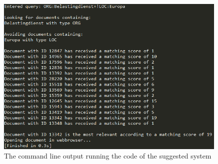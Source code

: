 \begin{figure}
    \centering
    \includegraphics[scale=0.8]{fig/sys_out}
    \caption{The command line output running the code of the suggested system}
    \label{fig:sys_out}
\end{figure}

